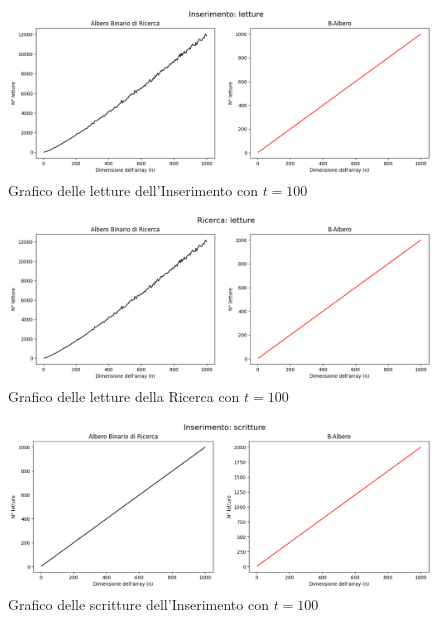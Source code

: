\begin{figure}[H]
    \centering
    \includegraphics[width=\textwidth]{side-graphs/insert-r-t100.png}
    \caption{Grafico delle letture dell'Inserimento con $t=100$}
    \label{fig:sidegraphinsertread100}
\end{figure}
    
\begin{figure}[H]
    \centering
    \includegraphics[width=\textwidth]{side-graphs/search-r-t100.png}
    \caption{Grafico delle letture della Ricerca con $t=100$}
    \label{fig:sidegraphsearchread100}
\end{figure}

\begin{figure}[H]
    \centering
    \includegraphics[width=\textwidth]{side-graphs/insert-w-t100.png}
    \caption{Grafico delle scritture dell'Inserimento con $t=100$}
    \label{fig:sidegraphinsertwrite100}
\end{figure}
    
